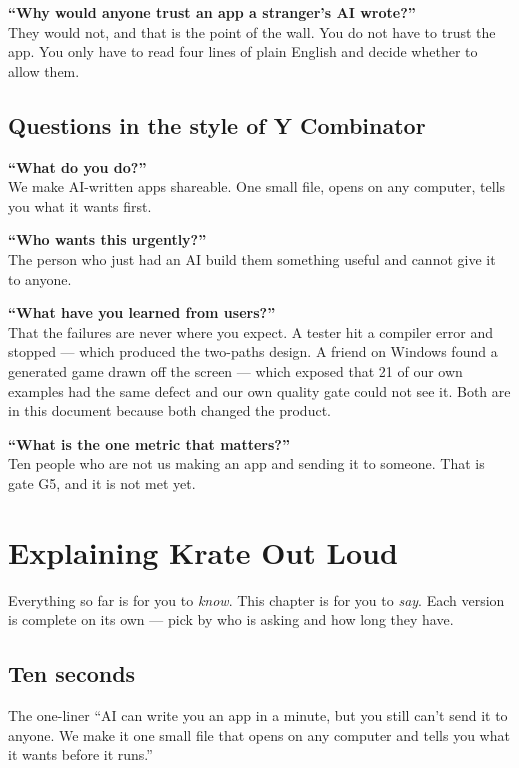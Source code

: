 \documentclass[11pt,a4paper]{report}
\begin{document}
\textbf{``Why would anyone trust an app a stranger's AI wrote?''}\\
They would not, and that is the point of the wall. You do not have to
trust the app. You only have to read four lines of plain English and
decide whether to allow them.

\section{Questions in the style of Y Combinator}

\textbf{``What do you do?''}\\
We make AI-written apps shareable. One small file, opens on any computer,
tells you what it wants first.

\textbf{``Who wants this urgently?''}\\
The person who just had an AI build them something useful and cannot give
it to anyone.

\textbf{``What have you learned from users?''}\\
That the failures are never where you expect. A tester hit a compiler
error and stopped --- which produced the two-paths design. A friend on
Windows found a generated game drawn off the screen --- which exposed that
21 of our own examples had the same defect and our own quality gate could
not see it. Both are in this document because both changed the product.

\textbf{``What is the one metric that matters?''}\\
Ten people who are not us making an app and sending it to someone. That is
gate G5, and it is not met yet.

\chapter{Explaining Krate Out Loud}

Everything so far is for you to \emph{know}. This chapter is for you to
\emph{say}. Each version is complete on its own --- pick by who is asking
and how long they have.

\section{Ten seconds}

\begin{plainbox}{The one-liner}
``AI can write you an app in a minute, but you still can't send it to
anyone. We make it one small file that opens on any computer and tells you
what it wants before it runs.''
\end{plainbox}
\end{document}
